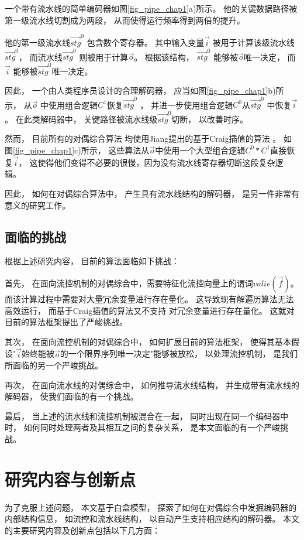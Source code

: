 一个带有流水线的简单编码器如图\ref{fig_pipe_chap1}a)所示。
他的关键数据路径被第一级流水线切割成为两段，
从而使得运行频率得到两倍的提升。

他的第一级流水线$\vec{stg}^0$ 包含数个寄存器。
其中输入变量$\vec{i}$ 被用于计算该级流水线$\vec{stg}^0$，
而流水线$\vec{stg}^0$ 则被用于计算$\vec{o}$。
根据该结构，
$\vec{stg}^0$ 能够被$\vec{o}$唯一决定，
而$\vec{i}$ 能够被$\vec{stg}^0$唯一决定。

因此，
一个由人类程序员设计的合理解码器，
应当如图\ref{fig_pipe_chap1}b)所示，
从$\vec{o}$ 中使用组合逻辑$C^1$恢复$\vec{stg}^0$ ，
并进一步使用组合逻辑$C^0$从$\vec{stg}^0$ 中恢复$\vec{i}$ 。
在此类解码器中，
关键路径被流水线级$\vec{stg}^0$切断，
以改善时序。

然而，
目前所有的对偶综合算法
均使用Jiang提出的基于Craig插值的算法 。
如图\ref{fig_pipe_chap1}c)所示，
这些算法从$\vec{o}$中使用一个大型组合逻辑$C^0*C^1$直接恢复$\vec{i}$，
这使得他们变得不必要的很慢，因为没有流水线寄存器切断这段复杂逻辑。

因此，
如何在对偶综合算法中，
产生具有流水线结构的解码器，
是另一件非常有意义的研究工作。



\subsection{面临的挑战}

根据上述研究内容，
目前的算法面临如下挑战：

首先，
在面向流控机制的对偶综合中，需要特征化流控向量上的谓词$valie(\vec{f})$。
而该计算过程中需要对大量冗余变量进行存在量化。
这导致现有解遍历算法无法高效运行，
而基于Craig插值的算法又不支持 对冗余变量进行存在量化。
这就对目前的算法框架提出了严峻挑战。


其次，
在面向流控机制的对偶综合中，
如何扩展目前的算法框架，
使得其基本假设"$\vec{i}$始终能被$\vec{o}$的一个限界序列唯一决定"能够被放松，
以处理流控机制，
是我们所面临的另一个严峻挑战。

再次，
在面向流水线的对偶综合中，
如何推导流水线结构，
并生成带有流水线的解码器，
使我们面临的有一个挑战。

最后，
当上述的流水线和流控机制被混合在一起，
同时出现在同一个编码器中时，
如何同时处理两者及其相互之间的复杂关系，
是本文面临的有一个严峻挑战。






\section{研究内容与创新点}\label{sec_contest_innov}
为了克服上述问题，
本文基于白盒模型，
探索了如何在对偶综合中发掘编码器的内部结构信息，
如流控和流水线结构，
以自动产生支持相应结构的解码器。
本文的主要研究内容及创新点包括以下几方面：

